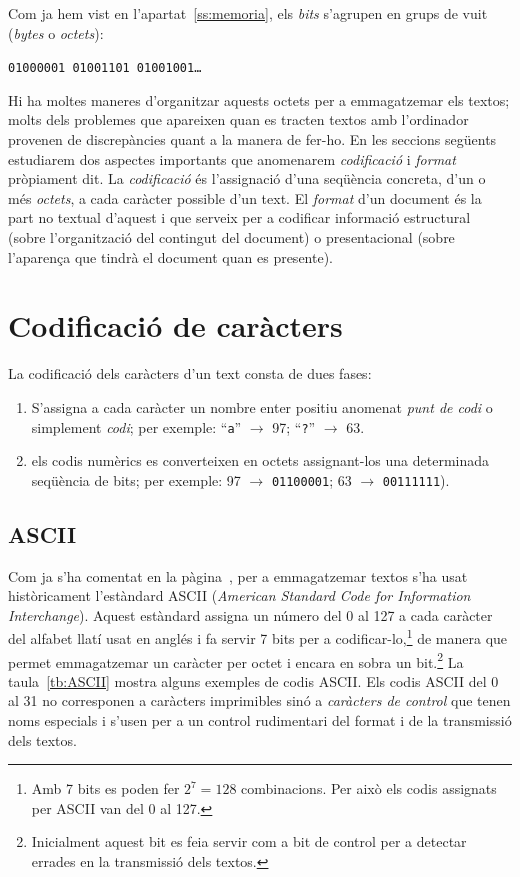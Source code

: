 Com ja hem vist en l'apartat~\ref{ss:memoria}, els \emph{bits}
s'agrupen en grups de vuit (\emph{bytes} o \emph{octets}):
\begin{center}
 \texttt{01000001 01001101 01001001\ldots}
\end{center}

Hi ha moltes maneres d'organitzar aquests octets per a emmagatzemar
els textos; molts dels problemes que apareixen quan es tracten textos
amb l'ordinador provenen de discrepàncies quant a la manera de fer-ho.
En les seccions següents estudiarem dos aspectes importants que
anomenarem \emph{codificació} i \emph{format} pròpiament dit.  La
\emph{codificació} és l'assignació d'una seqüència concreta, d'un o
més \emph{octets}, a cada caràcter possible d'un text. El
\emph{format} d'un document és la part no textual d'aquest i que
serveix per a codificar informació estructural (sobre l'organització
del contingut del document) o presentacional (sobre l'aparença que
tindrà el document quan es presente).

\section{Codificació de caràcters}
La codificació dels caràcters d'un text consta de dues fases: 
\begin{enumerate}
\item S'assigna a cada caràcter un nombre enter positiu anomenat
  \emph{punt de codi} o simplement \emph{codi}; per exemple:
  ``\texttt{a}'' $\to$ 97; ``\texttt{?}'' $\to$ 63.
\item els codis numèrics es converteixen en octets assignant-los una
  determinada seqüència de bits; per exemple: 97 $\to$
  \texttt{01100001}; 63 $\to$ \texttt{00111111}).
\end{enumerate}

\subsection{ASCII}
Com ja s'ha comentat en la pàgina~\pageref{pg:ASCII}, per a
emmagatzemar textos s'ha usat històricament l'estàndard ASCII
(\emph{American Standard Code for Information Interchange}). Aquest
estàndard assigna un número del 0 al 127 a cada caràcter del alfabet
llatí usat en anglés i fa servir 7 bits per a
codificar-lo,\footnote{Amb 7 bits es poden fer $2^7=128$
  combinacions. Per això els codis assignats per ASCII van del 0 al
  127.} de manera que permet emmagatzemar un caràcter per octet i
encara en sobra un bit.\footnote{Inicialment aquest bit es feia servir
  com a bit de control per a detectar errades en la transmissió dels
  textos.} La taula~\ref{tb:ASCII} mostra alguns exemples de codis
ASCII. Els codis ASCII del 0 al 31 no corresponen a caràcters
imprimibles sinó a \emph{caràcters de control} que tenen noms
especials i s'usen per a un control rudimentari del format i de la
transmissió dels textos.

